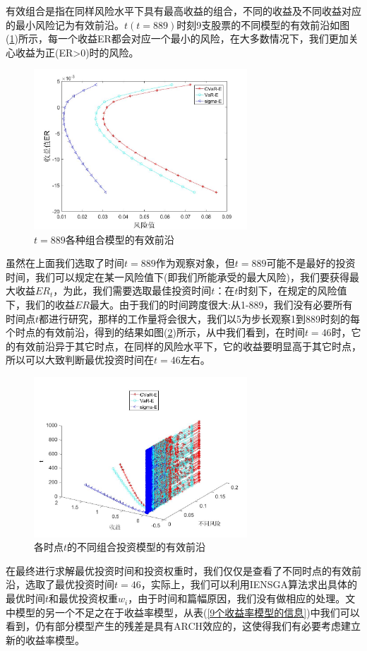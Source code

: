         \par
        有效组合是指在同样风险水平下具有最高收益的组合，不同的收益及不同收益对应的最小风险记为有效前沿。$t (t=889)$时刻9支股票的不同模型的有效前沿如图(\ref{各种组合模型的有效前沿})所示，每一个收益ER都会对应一个最小的风险，在大多数情况下，我们更加关心收益为正(ER>0)时的风险。
        \begin{figure}[H]
        \centering
        \includegraphics[width = 8cm ]{images/youxiaoqianyan.jpg}
        \caption{$t=889$各种组合模型的有效前沿}
        \label{各种组合模型的有效前沿}
        \end{figure}
        \par
        虽然在上面我们选取了时间$t=889$作为观察对象，但$t=889$可能不是最好的投资时间，我们可以规定在某一风险值下(即我们所能承受的最大风险)，我们要获得最大收益$ER_t$，为此，我们需要选取最佳投资时间$t$：在$t$时刻下，在规定的风险值下，我们的收益$ER$最大。由于我们的时间跨度很大:从1-889，我们没有必要所有时间点$t$都进行研究，那样的工作量将会很大，我们以5为步长观察1到889时刻的每个时点的有效前沿，得到的结果如图(\ref{各时点t的不同组合投资模型的有效前沿})所示，从中我们看到，在时间$t=46$时，它的有效前沿异于其它时点，在同样的风险水平下，它的收益要明显高于其它时点，所以可以大致判断最优投资时间在$t=46$左右。
        \begin{figure}[H]
        \centering
        \includegraphics[width = 8cm]{images/t-cvar.jpg}
        \caption{各时点$t$的不同组合投资模型的有效前沿}
        \label{各时点t的不同组合投资模型的有效前沿}
        \end{figure}
        \par
        在最终进行求解最优投资时间和投资权重时，我们仅仅是查看了不同时点的有效前沿，选取了最优投资时间$t=46$，实际上，我们可以利用IENSGA算法求出具体的最优时间$t$和最优投资权重$w_i$，由于时间和篇幅原因，我们没有做相应的处理。文中模型的另一个不足之在于收益率模型，从表(\ref{9个收益率模型的信息})中我们可以看到，仍有部分模型产生的残差是具有ARCH效应的，这使得我们有必要考虑建立新的收益率模型。

% 
